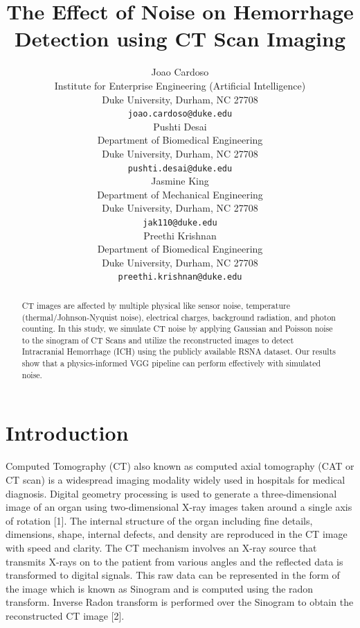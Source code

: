 \documentclass{article}
\title{The Effect of Noise on Hemorrhage Detection using CT Scan Imaging}
\author{%
  Joao Cardoso \\
  Institute for Enterprise Engineering (Artificial Intelligence)\\
  Duke University, Durham, NC 27708\\
  \texttt{joao.cardoso@duke.edu} \\
   \And
Pushti Desai \\
Department of Biomedical Engineering \\
Duke University, Durham, NC 27708 \\
 \texttt{pushti.desai@duke.edu} \\
   \AND
Jasmine King \\
Department of Mechanical Engineering \\
Duke University, Durham, NC 27708 \\
 \texttt{jak110@duke.edu} \\
  \AND
Preethi Krishnan \\
Department of Biomedical Engineering \\
Duke University, Durham, NC 27708 \\
 \texttt{preethi.krishnan@duke.edu} \\
}
\begin{document}
\maketitle

\begin{abstract}
  CT images are affected by multiple physical  like sensor noise, temperature (thermal/Johnson-Nyquist noise), electrical charges, background radiation, and photon counting. In this study, we simulate CT noise by applying Gaussian and Poisson noise to the sinogram of CT Scans and utilize the reconstructed images to detect Intracranial Hemorrhage (ICH) using the publicly available RSNA dataset. Our results show that a physics-informed VGG pipeline can perform effectively with simulated noise. 
\end{abstract}

\section{Introduction}
\begin{par}
    Computed Tomography (CT) also known as computed axial tomography (CAT or CT scan) is a widespread imaging modality widely used in hospitals for medical diagnosis. Digital geometry processing is used to generate a three-dimensional image of an organ using two-dimensional X-ray images taken around a single axis of rotation [1]. The internal structure of the organ including fine details, dimensions, shape, internal defects, and density are reproduced in the CT image with speed and clarity. The CT mechanism involves an X-ray source that transmits X-rays on to the patient from various angles and the reflected data is transformed to digital signals. This raw data can be represented in the form of the image which is known as Sinogram and is computed using the radon transform. Inverse Radon transform is performed over the Sinogram to obtain the reconstructed CT image [2].
\end{par}
\end{document}
